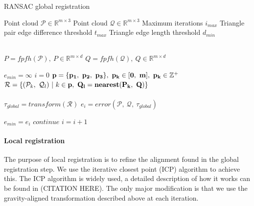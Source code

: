 \begin{algorithm}
    \caption{RANSAC global registration}\label{alg:ransac}
    \begin{algorithmic}

    \Require \quad Point cloud \(\mathcal{P} \in \mathbb{R}^{m \times 3}\)
    \Require \quad Point cloud \(\mathcal{Q} \in \mathbb{R}^{m \times 3}\)
    \Require \quad Maximum iterations \(i_{max}\)
    \Require \quad Triangle pair edge difference threshold \(t_{max}\)
    \Require \quad Triangle edge length threshold \(d_{min}\)

    \\
    \State \(P = fpfh(\mathcal{P}),\ P \in \mathbb{R}^{m \times d}\)
    \State \(Q = fpfh(\mathcal{Q}),\ Q \in \mathbb{R}^{m \times d}\)

    \State $e_{min} = \infty$
    \State \(i = 0\)
        \State \(\bf{p} = \{p_1,\ p_2,\ p_3\},\ p_k \in [0,\ m],\ p_k \in \mathbb{Z}^+\) 
        \\
        \State \(\mathcal{R} = \{(\mathcal{P}_k,\ \mathcal{Q}_l)\ |\ k \in \bf{p},\ Q_l = nearest(P_k,\ Q)\}\) 
        \\
         
            \\
            \State $\tau_{global} = transform(\mathcal{R})$ 
            \State $e_i = error(\mathcal{P},\ \mathcal{Q},\ \tau_{global})$ 

             
                \State $e_{min} = e_i$
            \EndIf
        \Else
            \State $continue$
        \EndIf
        \State \(i = i + 1\)
    \EndWhile
    \end{algorithmic}
\end{algorithm}


\paragraph{Local registration}
The purpose of local registration is to refine the alignment found in the global registration step. We use the iterative closest point (ICP) algorithm to achieve this. The ICP algorithm is widely used, a detailed description of how it works can be found in (CITATION HERE). The only major modification is that we use the gravity-aligned transformation described above at each iteration.

